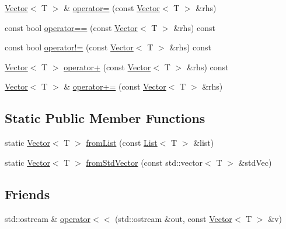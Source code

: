 \begin{DoxyCompactItemize}
\hyperlink{classprism_1_1containers_1_1_vector}{Vector}$<$ T $>$ \& \hyperlink{classprism_1_1containers_1_1_vector_a1d7f4422d23cc8517ffeef1de6d946b7}{operator=} (const \hyperlink{classprism_1_1containers_1_1_vector}{Vector}$<$ T $>$ \&rhs)
\item 
const bool \hyperlink{classprism_1_1containers_1_1_vector_aa8f12b0a2b30bb59058c0d1207193b6d}{operator==} (const \hyperlink{classprism_1_1containers_1_1_vector}{Vector}$<$ T $>$ \&rhs) const 
\item 
const bool \hyperlink{classprism_1_1containers_1_1_vector_aa10ff799ba15b841ae755e45d23fedf1}{operator!=} (const \hyperlink{classprism_1_1containers_1_1_vector}{Vector}$<$ T $>$ \&rhs) const 
\item 
\hyperlink{classprism_1_1containers_1_1_vector}{Vector}$<$ T $>$ \hyperlink{classprism_1_1containers_1_1_vector_a0a85af5e487dd19ffed0b9528dffbc3c}{operator+} (const \hyperlink{classprism_1_1containers_1_1_vector}{Vector}$<$ T $>$ \&rhs) const 
\item 
\hyperlink{classprism_1_1containers_1_1_vector}{Vector}$<$ T $>$ \& \hyperlink{classprism_1_1containers_1_1_vector_a55650d16d61b9f33fcaa3cfa134b34d2}{operator+=} (const \hyperlink{classprism_1_1containers_1_1_vector}{Vector}$<$ T $>$ \&rhs)
\end{DoxyCompactItemize}
\subsection*{Static Public Member Functions}
\begin{DoxyCompactItemize}
\item 
static \hyperlink{classprism_1_1containers_1_1_vector}{Vector}$<$ T $>$ \hyperlink{classprism_1_1containers_1_1_vector_a8b0deb146005e35368d6ad8e914cb6fd}{from\+List} (const \hyperlink{classprism_1_1containers_1_1_list}{List}$<$ T $>$ \&list)
\item 
static \hyperlink{classprism_1_1containers_1_1_vector}{Vector}$<$ T $>$ \hyperlink{classprism_1_1containers_1_1_vector_ad14e6cf4155c41528dfe0d1699264991}{from\+Std\+Vector} (const std\+::vector$<$ T $>$ \&std\+Vec)
\end{DoxyCompactItemize}
\subsection*{Friends}
\begin{DoxyCompactItemize}
\item 
std\+::ostream \& \hyperlink{classprism_1_1containers_1_1_vector_adea1a7e2e26629669d11a49d8899a1ec}{operator$<$$<$} (std\+::ostream \&out, const \hyperlink{classprism_1_1containers_1_1_vector}{Vector}$<$ T $>$ \&v)
\end{DoxyCompactItemize}


